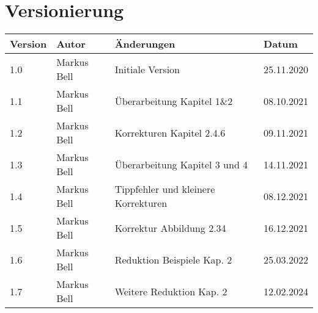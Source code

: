 %
\chapter*{Versionierung}
%
\begin{table}[ht!]
	\begin{tabular}{|m{3cm}|m{3cm}|m{3cm}|m{3cm}|} \hline
		\textbf{Version} & \textbf{Autor} & \textbf{Änderungen} & \textbf{Datum}\\ \hline\hline
		1.0 & Markus Bell & Initiale Version & 25.11.2020\\\hline
		1.1 & Markus Bell & Überarbeitung Kapitel 1\&2 & 08.10.2021\\\hline
		1.2 & Markus Bell & Korrekturen Kapitel 2.4.6 & 09.11.2021\\\hline
		1.3 & Markus Bell & Überarbeitung Kapitel 3 und 4 & 14.11.2021\\\hline
		1.4 & Markus Bell & Tippfehler und kleinere Korrekturen & 08.12.2021\\\hline
		1.5 & Markus Bell & Korrektur Abbildung 2.34 & 16.12.2021\\\hline
		1.6 & Markus Bell & Reduktion Beispiele Kap. 2 & 25.03.2022\\\hline
		1.7 & Markus Bell & Weitere Reduktion Kap. 2 & 12.02.2024\\\hline
	\end{tabular}
	\label{tab:Version}
\end{table}
\newpage
